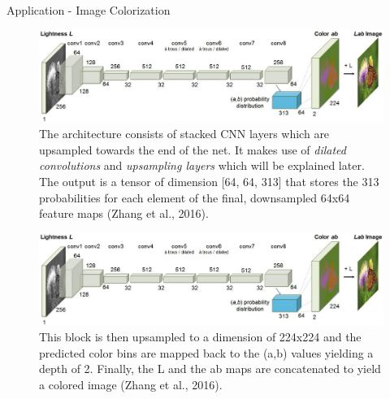 \begin{vbframe}{Application - Image Colorization}
\begin{figure}
            \end{figure}
            \framebreak
            \begin{figure}
            \centering
            \includegraphics[width=11.5cm]{figure/color_architecture.png}
            \caption{The architecture consists of stacked CNN layers which are upsampled towards the end of the net. It makes use of \textit{dilated convolutions} and \textit{upsampling layers} which will be explained later. The output is a tensor of dimension [64, 64, 313] that stores the 313 probabilities for each element of the final, downsampled 64x64 feature maps (Zhang et al., 2016).} 
            \end{figure}
            \framebreak
            \begin{figure}
            \centering
            \includegraphics[width=11.5cm]{figure/color_architecture.png}
            \caption{This block is then upsampled to a dimension of 224x224 and the predicted color bins are mapped back to the (a,b) values yielding a depth of 2. Finally, the L and the ab maps are concatenated to yield a colored image (Zhang et al., 2016).} 
            \end{figure}
            \end{vbframe}
